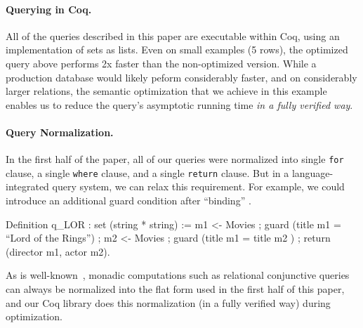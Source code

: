 \documentclass[preprint]{sigplanconf}
\begin{document}

 


\paragraph{Querying in Coq.} All of the queries described in this paper are executable within Coq, using an implementation of sets as lists.  Even on small examples (5 rows), the optimized query above performs 2x faster than the non-optimized version.
While a production database would likely peform considerably faster, and on considerably larger relations, the semantic optimization that we achieve in this example enables us to reduce the query's asymptotic running time \emph{in a fully verified way}.

\paragraph{Query Normalization.} In the first half of the paper, all of our queries were normalized into single {\tt for} clause, a single {\tt where} clause, and a single {\tt return} clause.  But in a language-integrated query system, we can relax this requirement.  For example, we could introduce an additional guard condition after ``binding'' .
\begin{coq}
Definition q_LOR : set (string * string) :=
  m1 <- Movies ;
  guard (title m1 = ``Lord of the Rings'') ;
  m2 <- Movies ;
  guard (title m1  = title m2 ) ;
  return (director m1, actor m2).
\end{coq}
As is well-known~\cite{monad}, monadic computations such as relational conjunctive queries can always be normalized into the flat form used in the first half of this paper, and our Coq library does this normalization (in a fully verified way) during optimization.
\end{document}
